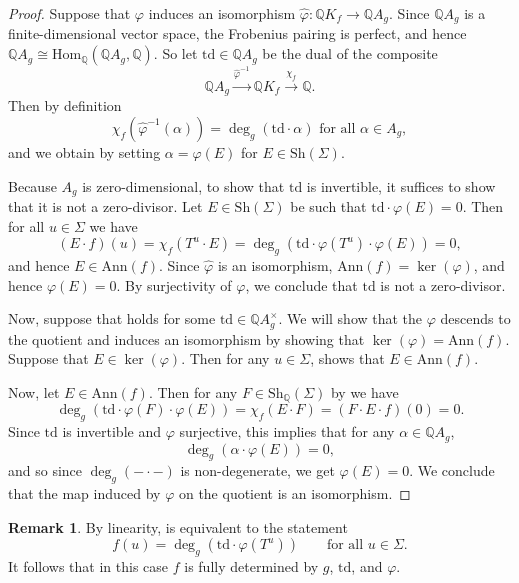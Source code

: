 \documentclass[oneside]{amsart}
\theoremstyle{plain}
\theoremstyle{definition}
\newtheorem{remark}[theorem]{Remark}
\newcommand{\Q}{{\mathbb{Q}}}
\newcommand{\Ann}{{\mathrm{Ann}}}
\newcommand{\Hom}{{\mathrm{Hom}}}
\newcommand{\Sh}{{\mathrm{Sh}}}
\newcommand{\td}{{\mathrm{td}}}
\begin{document}
\begin{proof}
    Suppose that $\varphi$ induces an isomorphism $\hat{\varphi}: \Q K_f \to \Q A_g$. Since $\Q A_g$ is a finite-dimensional vector space, the Frobenius pairing is perfect, and hence $\Q A_g \cong \Hom_\Q(\Q A_g, \Q)$.
    So let $\td \in \Q A_g$ be the dual of the composite 
    \[\Q A_g \xrightarrow{\hat{\varphi}^{-1}} \Q K_f \xrightarrow{\chi_f} \Q.\]
    Then by definition
    \[\chi_f(\hat{\varphi}^{-1}(\alpha)) = \deg_g(\td\cdot \alpha)\textrm{ for all }\alpha \in A_g,\]
    and we obtain  by setting $\alpha=\varphi(E)$ for $E\in \Sh(\Sigma)$.

    Because $A_g$ is zero-dimensional, to show that $\td$ is invertible, it suffices to show that it is not a zero-divisor. Let $E\in \Sh(\Sigma)$ be such that $\td\cdot \varphi(E)=0$. Then for all $u\in \Sigma$ we have
        \begin{equation}\label{eq:hrr-shift}
        (E\cdot f)(u) = \chi_f(T^u\cdot E) = \deg_g(\td\cdot\varphi(T^u)\cdot\varphi(E) )
        = 0,
        \end{equation}
    and hence $E \in \Ann(f)$. Since $\hat\varphi$ is an isomorphism, $\Ann(f) = \ker(\varphi)$, and hence
    $\varphi(E)=0$. By surjectivity of $\varphi$, we conclude that $\td$ is not a zero-divisor.

    Now, suppose that  holds for some $\td \in \Q A_g^\times$. We will show that
    the $\varphi$ descends to the quotient and induces an isomorphism by showing that $\ker(\varphi)=\Ann(f)$. Suppose that $E \in \ker(\varphi)$.
    Then for any $u \in \Sigma$,  shows that
    $E \in \Ann(f)$. 
    
    Now, let $E \in \Ann(f)$. Then for any $F \in \Sh_\Q(\Sigma)$ by  we have
    \[\deg_g(\td \cdot \varphi(F) \cdot \varphi(E)) = \chi_f(E \cdot F) = (F \cdot E \cdot f)(0) = 0.\]
    Since $\td$ is invertible and $\varphi$ surjective, this implies that for any $\alpha \in \Q A_g$, 
    \[\deg_g(\alpha \cdot \varphi(E)) = 0,\]
    and so since $\deg_g(-\cdot -)$ is non-degenerate, we get $\varphi(E) = 0$. We conclude that the map induced by $\varphi$ on the quotient is an isomorphism.
\end{proof}

\begin{remark}
    \label{rem:hrr-equivalent-statement}
    By linearity,  is equivalent to the statement
    \[
        f(u) = \deg_g(\td \cdot \varphi(T^u))\qquad\textrm{for all }u \in \Sigma.
    \]
    It follows that in this case $f$ is fully determined by $g$, $\td$, and $\varphi$.
\end{remark}
\end{document}
